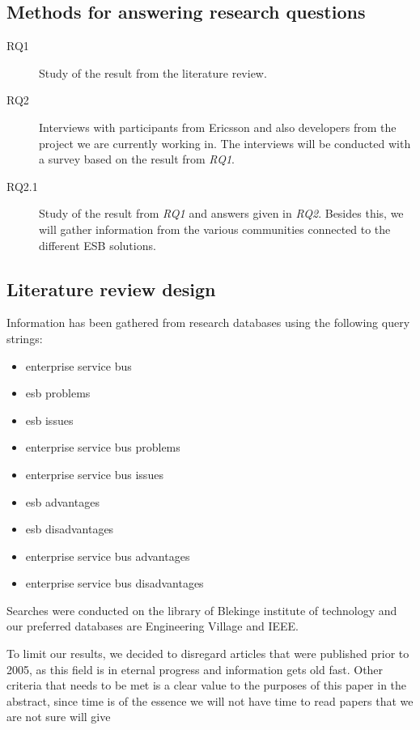 \documentclass{llncs}
\begin{document}
\subsection{Methods for answering research questions}

\begin{description}
\item[RQ1] Study of the result from the literature review.
\item[RQ2] Interviews with participants from Ericsson and also developers from the project we are currently working in. The interviews will be conducted with a survey based on the result from \emph{RQ1}.
\item[RQ2.1] Study of the result from \emph{RQ1} and answers given in \emph{RQ2}. Besides this, we will gather information from the various communities connected to the different ESB solutions.
\end{description}

\subsection{Literature review design}
Information has been gathered from research databases using the following query strings:
\begin{itemize}
\item enterprise service bus
\item esb problems
\item esb issues
\item enterprise service bus problems
\item enterprise service bus issues
\item esb advantages
\item esb disadvantages
\item enterprise service bus advantages
\item enterprise service bus disadvantages
\end{itemize}

Searches were conducted on the library of Blekinge institute of technology and our preferred databases are Engineering Village and IEEE.

To limit our results, we decided to disregard articles that were published prior to 2005, as this field is in eternal progress and information gets old fast.
Other criteria that needs to be met is a clear value to the purposes of this paper in the abstract, since time is of the essence we will not have time to read papers that we are not sure will give 
\end{document}
